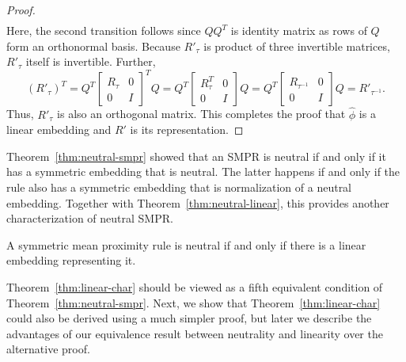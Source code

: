 \documentclass[prodmode,acmec]{ec-acmsmall}
\begin{document}
\begin{proof}
\begin{align*}
\end{align*}
Here, the second transition follows since $Q Q^T$ is identity matrix as rows of $Q$ form an orthonormal basis. Because $R'_{\tau}$ is product of three invertible matrices, $R'_{\tau}$ itself is invertible. Further, 
$$
(R'_{\tau})^T = Q^T \left[ \begin{smallmatrix} R_{\tau} & 0 \\ 0 & I \end{smallmatrix} \right]^T Q = Q^T \left[ \begin{smallmatrix} R_{\tau}^T & 0 \\ 0 & I \end{smallmatrix} \right] Q = Q^T \left[ \begin{smallmatrix} R_{\tau^{-1}} & 0 \\ 0 & I \end{smallmatrix} \right] Q
 = R'_{\tau^{-1}}.
 $$
Thus, $R'_{\tau}$ is also an orthogonal matrix. This completes the proof that $\hat{\phi}$ is a linear embedding and $R'$ is its representation.
\end{proof}

Theorem~\ref{thm:neutral-smpr} showed that an SMPR is neutral if and only if it has a symmetric embedding that is neutral. The latter happens if and only if the rule also has a symmetric embedding that is normalization of a neutral embedding. Together with Theorem~\ref{thm:neutral-linear}, this provides another characterization of neutral SMPR. 

\begin{theorem}
A symmetric mean proximity rule is neutral if and only if there is a linear embedding representing it.
\label{thm:linear-char}
\end{theorem}

Theorem~\ref{thm:linear-char} should be viewed as a fifth equivalent condition of Theorem~\ref{thm:neutral-smpr}. Next, we show that Theorem~\ref{thm:linear-char} could also be derived using a much simpler proof, but later we describe the advantages of our equivalence result between neutrality and linearity over the alternative proof. 
\end{document}
